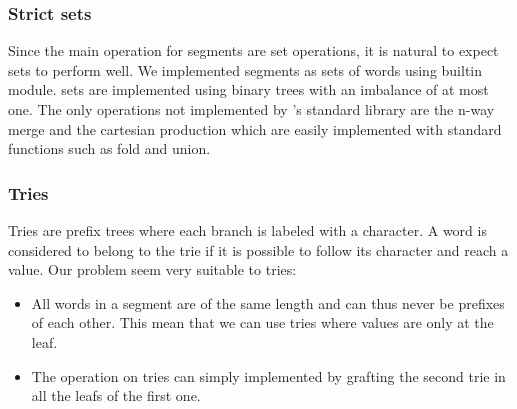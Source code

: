 \subsubsection{Strict sets}

Since the main operation for segments are set operations, it is natural to
expect sets to perform well. We implemented segments as sets
of words using \ocaml builtin  module. \ocaml sets are implemented
using binary trees with an imbalance of at most one.
The only operations not implemented by \ocaml's standard library are
the n-way merge and the cartesian production which are easily implemented with
standard functions such as fold and union.

\subsubsection{Tries}

Tries are prefix trees where each branch is labeled with
a character. A word is considered to belong to the trie if it is possible to
follow its character and reach a value. Our problem seem very suitable to tries:
\begin{itemize}
\item All words in a segment are of the same length and can thus never be prefixes
  of each other. This mean that we can use tries where values are only
  at the leaf.
\item The  operation on tries can simply implemented by
  grafting the second trie in all the leafs of the first one.
\end{itemize}

\TODO{}




